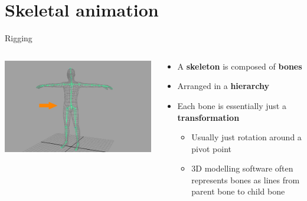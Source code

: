 \part{Skeletal animation}
\frame{\partpage}

\begin{frame}{Rigging}
	\begin{columns}
		\begin{column}{0.4\textwidth}
			\includegraphics[width=\textwidth]{human_rig}
		\end{column}
		\begin{column}{0.58\textwidth}
			\begin{itemize}
				\pause\item A \textbf{skeleton} is composed of \textbf{bones}
				\pause\item Arranged in a \textbf{hierarchy}
				\pause\item Each bone is essentially just a \textbf{transformation}
					\begin{itemize}
						\pause\item Usually just rotation around a pivot point
						\pause\item 3D modelling software often represents bones as lines from parent bone to child bone
					\end{itemize}
			\end{itemize}
		\end{column}
	\end{columns}
\end{frame}


